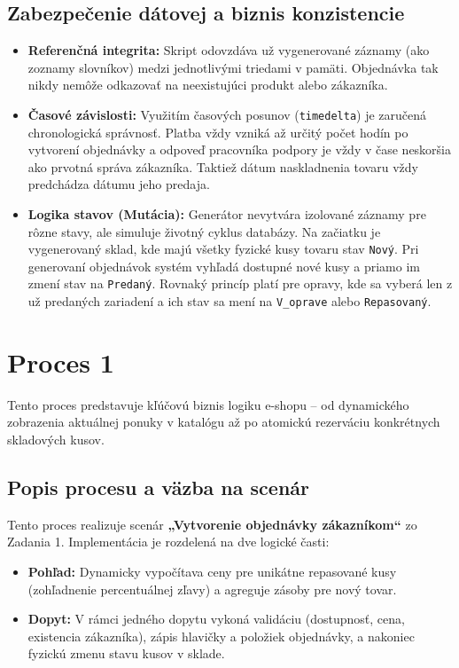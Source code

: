 \documentclass[11pt, a4paper]{article}
\begin{document}
\subsection{Zabezpečenie dátovej a biznis konzistencie}
\begin{itemize}
    \item \textbf{Referenčná integrita:} Skript odovzdáva už vygenerované záznamy (ako zoznamy slovníkov) medzi jednotlivými triedami v pamäti. Objednávka tak nikdy nemôže odkazovať na neexistujúci produkt alebo zákazníka.
    \item \textbf{Časové závislosti:} Využitím časových posunov (\texttt{timedelta}) je zaručená chronologická správnosť. Platba vždy vzniká až určitý počet hodín po vytvorení objednávky a odpoveď pracovníka podpory je vždy v čase neskoršia ako prvotná správa zákazníka. Taktiež dátum naskladnenia tovaru vždy predchádza dátumu jeho predaja.
    \item \textbf{Logika stavov (Mutácia):} Generátor nevytvára izolované záznamy pre rôzne stavy, ale simuluje životný cyklus databázy. Na začiatku je vygenerovaný sklad, kde majú všetky fyzické kusy tovaru stav \texttt{Nový}. Pri generovaní objednávok systém vyhľadá dostupné nové kusy a priamo im zmení stav na \texttt{Predaný}. Rovnaký princíp platí pre opravy, kde sa vyberá len z už predaných zariadení a ich stav sa mení na \texttt{V\_oprave} alebo \texttt{Repasovaný}.
\end{itemize}


\newpage
\section{Proces 1}
\label{sec:proces_1}
Tento proces predstavuje kľúčovú biznis logiku e-shopu – od dynamického zobrazenia aktuálnej ponuky v katalógu až po atomickú rezerváciu konkrétnych skladových kusov.

\subsection{Popis procesu a väzba na scenár}
Tento proces realizuje scenár \textbf{„Vytvorenie objednávky zákazníkom“} zo Zadania 1. Implementácia je rozdelená na dve logické časti:
\begin{itemize}
    \item \textbf{Pohľad:} Dynamicky vypočítava ceny pre unikátne repasované kusy (zohľadnenie percentuálnej zľavy) a agreguje zásoby pre nový tovar.
    \item \textbf{Dopyt:} V rámci jedného dopytu vykoná validáciu (dostupnosť, cena, existencia zákazníka), zápis hlavičky a položiek objednávky, a nakoniec fyzickú zmenu stavu kusov v sklade.
\end{itemize}
\end{document}
